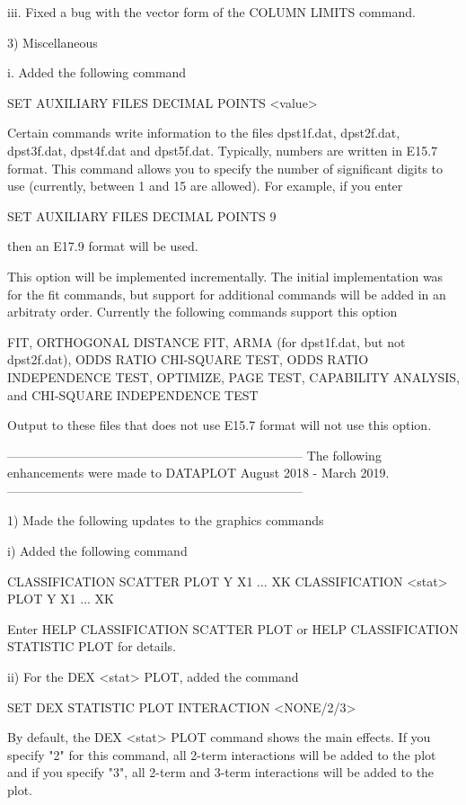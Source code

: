     iii. Fixed a bug with the vector form of the COLUMN LIMITS command.

 3) Miscellaneous

      i. Added the following command

           SET AUXILIARY FILES DECIMAL POINTS <value>

         Certain commands write information to the files dpst1f.dat,
         dpst2f.dat, dpst3f.dat, dpst4f.dat and dpst5f.dat.  Typically,
         numbers are written in E15.7 format.  This command allows you to
         specify the number of significant digits to use (currently,
         between 1 and 15 are allowed).  For example, if you enter

           SET AUXILIARY FILES DECIMAL POINTS 9

         then an E17.9 format will be used.

         This option will be implemented incrementally.  The initial
         implementation was for the fit commands, but support for
         additional commands will be added in an arbitraty order.
         Currently the following commands support this option

           FIT, ORTHOGONAL DISTANCE FIT, ARMA (for dpst1f.dat, but not
           dpst2f.dat), ODDS RATIO CHI-SQUARE TEST, ODDS RATIO
           INDEPENDENCE TEST, OPTIMIZE, PAGE TEST, CAPABILITY ANALYSIS,
           and CHI-SQUARE INDEPENDENCE TEST

         Output to these files that does not use E15.7 format will not
         use this option.

-----------------------------------------------------------------------
The following enhancements were made to DATAPLOT
August 2018 - March 2019.
-----------------------------------------------------------------------

 1) Made the following updates to the graphics commands

      i) Added the following command

           CLASSIFICATION SCATTER PLOT Y X1 ... XK
           CLASSIFICATION <stat> PLOT  Y X1 ... XK

         Enter HELP CLASSIFICATION SCATTER PLOT or
         HELP CLASSIFICATION STATISTIC PLOT for details.

     ii) For the DEX <stat> PLOT, added the command

            SET DEX STATISTIC PLOT INTERACTION <NONE/2/3>

         By default, the DEX <stat> PLOT command shows the main effects.
         If you specify "2" for this command, all 2-term interactions
         will be added to the plot and if you specify "3", all 2-term
         and 3-term interactions will be added to the plot.

